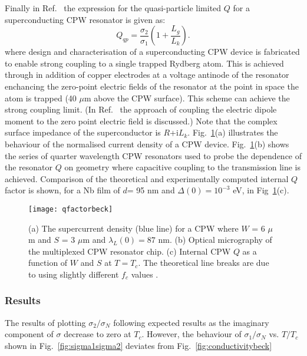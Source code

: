 Finally in Ref.~\citep{doi:10.1063/1.4962172} the expression for the quasi-particle limited $Q$ for a superconducting CPW resonator is given as:
\begin{equation}
\label{eq:Qquasilimited}
Q_{qp} = \frac{\sigma_{2}}{\sigma_{1}} \left ( 1 + \frac{L_{g}}{L_{k}} \right ).
\end{equation} 
where design and characterisation of a superconducting CPW device is fabricated to enable strong coupling to a single trapped Rydberg atom. This is achieved through in addition of copper electrodes at a voltage antinode of the resonator enchancing the zero-point electric fields of the resonator at the point in space the atom is trapped (40 $\mu$m above the CPW surface). This scheme can achieve the strong coupling limit. (In Ref.~\citep{PhysRevA.89.010301} the approach of coupling the electric dipole moment to the zero point electric field is discussed.) Note that the complex surface impedance of the superconductor is $R$+i$L_{k}$. Fig.~\ref{fig:qfactorbeck}(a) illustrates the behaviour of the normalised current density of a CPW device. Fig.~\ref{fig:qfactorbeck}(b) shows the series of quarter wavelength CPW resonators used to probe the dependence of the resonator $Q$ on geometry where capacitive coupling to the transmission line is achieved. Comparison of the theoretical and experimentally computed internal $Q$ factor is shown, for a Nb film of $d$= 95 nm and $\Delta (0) =10^{-3}$ eV, in Fig~\ref{fig:qfactorbeck}(c).  

\begin{figure}[H]
\centering
\texttt{[image: qfactorbeck]}
\caption{\label{fig:qfactorbeck} (a) The supercurrent density (blue line) for a CPW where $W$ = 6 $\mu$m and $S$ = 3 $\mu$m and $\lambda_{L}(0) = 87$ nm. (b) Optical micrography of the multiplexed CPW resonator chip. (c) Internal CPW $Q$ as a function of $W$ and $S$ at $T=T_{c}$. The theoretical line breaks are due to using slightly different $f_{c}$ values \citep{ doi:10.1063/1.4962172}.}
\end{figure}


\subsubsection{Results}
The results of plotting $\sigma_{2}/ \sigma_{N}$ following expected results as the imaginary component of $\sigma$ decrease to zero at $T_{c}$. However, the behaviour of $\sigma_{1} / \sigma_{N}$ vs. $T/T_{c}$ shown in Fig.~\ref{fig:sigma1sigma2} deviates from Fig.~\ref{fig:conductivitybeck}
    
